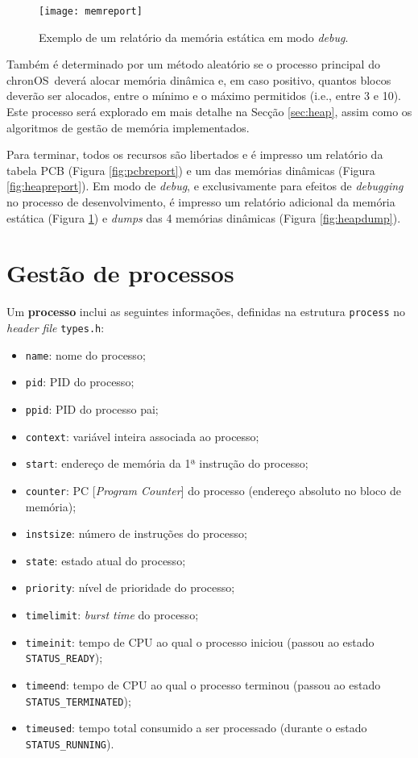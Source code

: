 \documentclass[10pt,oneside]{estiloUBI}
\newcommand{\chronOS}{\textsf{chronOS}}
\begin{document}
	\begin{figure}[!btp]
		\centering
		\texttt{[image: memreport]}
		\caption{Exemplo de um relatório da memória estática em modo \textit{debug}.}
		\label{fig:memreport}
	\end{figure}

	Também é determinado por um método aleatório se o processo principal do \chronOS~deverá alocar memória dinâmica e, em caso positivo, quantos blocos deverão ser alocados, entre o mínimo e o máximo permitidos (i.e., entre 3 e 10). Este processo será explorado em mais detalhe na Secção \ref{sec:heap}, assim como os algoritmos de gestão de memória implementados.

	Para terminar, todos os recursos são libertados e é impresso um relatório da tabela \ac{PCB} (Figura \ref{fig:pcbreport}) e um das memórias dinâmicas (Figura \ref{fig:heapreport}). Em modo de \textit{debug}, e exclusivamente para efeitos de \textit{debugging} no processo de desenvolvimento, é impresso um relatório adicional da memória estática (Figura \ref{fig:memreport}) e \textit{dumps} das 4 memórias dinâmicas (Figura \ref{fig:heapdump}).
	
	
	
	\chapter{Gestão de processos}
	\label{sec:process}
	
	Um \textbf{processo} inclui as seguintes informações, definidas na estrutura \verb|process| no \textit{header file} \texttt{types.h}:
	
	\begin{itemize}
		\item \verb|name|: nome do processo;
		\item \verb|pid|: \ac{PID} do processo;
		\item \verb|ppid|: \ac{PID} do processo pai;
		\item \verb|context|: variável inteira associada ao processo;
		\item \verb|start|: endereço de memória da 1ª instrução do processo;
		\item \verb|counter|: PC [\textit{Program Counter}] do processo (endereço absoluto no bloco de memória);
		\item \verb|instsize|: número de instruções do processo;
		\item \verb|state|: estado atual do processo;
		\item \verb|priority|: nível de prioridade do processo;
		\item \verb|timelimit|: \textit{burst time} do processo;
		\item \verb|timeinit|: tempo de \ac{CPU} ao qual o processo iniciou (passou ao estado \texttt{STATUS\_READY});
		\item \verb|timeend|: tempo de \ac{CPU} ao qual o processo terminou (passou ao estado \texttt{STATUS\_TERMINATED});
		\item \verb|timeused|: tempo total consumido a ser processado (durante o estado \texttt{STATUS\_RUNNING}).
	\end{itemize}
	
\end{document}

